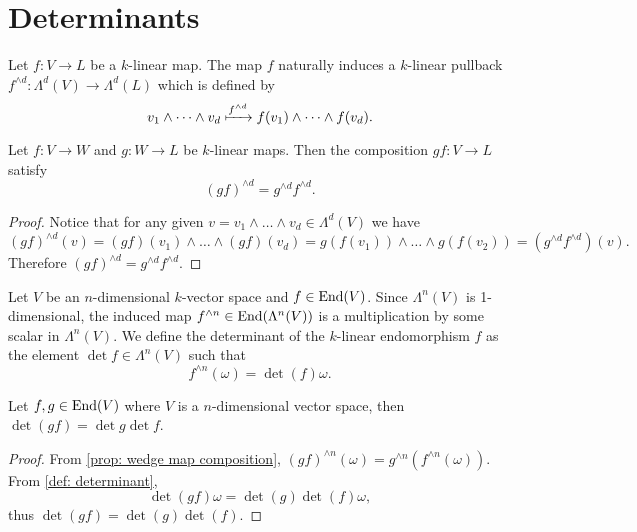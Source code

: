 \section{Determinants}

\begin{definition}\label{def: wedge map}
  Let \(f: V \to L\) be a \(k\)-linear map. The map \(f\) naturally induces a
  \(k\)-linear pullback \(f^{\wedge d}: \Lambda^d(V) \to \Lambda^d(L)\) which is defined by
  \[
    v_1 \wedge \dots \wedge v_d \xmapsto{f^{\wedge d}}
    f(v_1) \wedge \dots \wedge f(v_d).
  \]
\end{definition}

\begin{proposition}\label{prop: wedge map composition}
  Let \(f: V \to W\) and \(g: W \to L\) be \(k\)-linear maps. Then the
  composition \(g f: V \to L\) satisfy
  \[
    (g f)^{\wedge d} = g^{\wedge d} f^{\wedge d}.
  \]
\end{proposition}

\begin{proof}
  Notice that for any given \(v = v_1 \wedge \dots \wedge v_d \in \Lambda^d(V)\) we have
  \[
    (g f)^{\wedge d}(v) = (g f) (v_1) \wedge \dots \wedge (g f) (v_d)
    = g(f(v_1)) \wedge \dots \wedge g(f(v_2))
    = (g^{\wedge d} f^{\wedge d})(v).
  \]
  Therefore \((g f)^{\wedge d} = g^{\wedge d} f^{\wedge d}\).
\end{proof}

\begin{definition}[Determinant]\label{def: determinant}
  Let \(V\) be an \(n\)-dimensional \(k\)-vector space and \(f \in \operatorname{End}(V)\).
  Since \(\Lambda^n(V)\) is 1-dimensional, the induced map \(f^{\wedge n} \in \operatorname{End}(\Lambda^n
  (V))\) is a multiplication by some scalar in \(\Lambda^n(V)\).  We define the
  determinant of the \(k\)-linear endomorphism \(f\) as the element \(\det f
  \in \Lambda^n(V)\) such that
  \[
    f^{\wedge n}(\omega) = \det(f) \omega.
  \]
\end{definition}

\begin{proposition}\label{prop: comp det}
  Let \(f, g \in \operatorname{End}(V)\) where \(V\) is a \(n\)-dimensional vector space, then
  \(\det(g f) = \det g \det f\).
\end{proposition}

\begin{proof}
  From \cref{prop: wedge map composition}, \((g f)^{\wedge n}(\omega) =
  g^{\wedge n}(f^{\wedge n}(\omega))\). From \cref{def: determinant},
  \[
    \det(g f) \omega = \det(g) \det(f) \omega,
  \]
  thus \(\det(g f) = \det(g) \det(f)\).
\end{proof}

